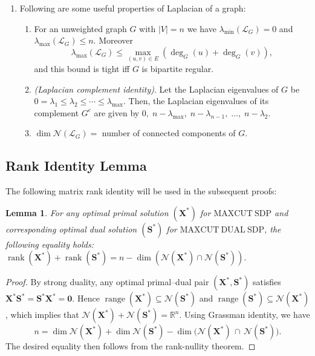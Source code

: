 \documentclass[a4paper,fleqn]{cas-sc}
\newcommand{\R}{\mathbb{R}}
\newcommand{\X}{\mathbf{X}}
\renewcommand{\L}{\mathcal{L}}
\newcommand{\1}{\mathbf{1}}
\newcommand{\bz}{\mathbf{0}}
\newcommand{\bS}{\mathbf{S}}
\newtheorem{lemma}[theorem]{Lemma}
\DeclareMathOperator{\rank}{rank}
\DeclareMathOperator{\range}{range}
\begin{document}
\begin{enumerate}
\item Following are some useful properties of Laplacian of a graph:

\begin{enumerate}
        \item For an unweighted graph \(G\) with \(|V|=n\) we have \(\lambda_{\min}(\L_G)=0\) and \(\lambda_{\max}(\L_G)\le n\). Moreover
\[
\lambda_{\max}(\L_G)\le\max_{(u,v)\in E}(\deg_G(u)+\deg_G(v)),
\]
and this bound is tight iff \(G\) is bipartite regular.
    \item \textit{(Laplacian complement identity)}. Let the Laplacian eigenvalues of $G$ be $0 = \lambda_1 \le \lambda_2 \le \cdots \le \lambda_{\max}$. Then, the Laplacian eigenvalues of its complement $G^c$ are given by $0, \; n - \lambda_{\max}, \; n - \lambda_{n-1}, \; \dots, \; n - \lambda_2$.
    \item $\dim \mathcal{N}(\L_G)=$ number of connected components of $G$.
\end{enumerate}
\end{enumerate}

\subsection{Rank Identity Lemma}

The following matrix rank identity will be used in the subsequent proofs:

\begin{lemma}\label{sylvester}
   For any optimal primal solution $(\X^*)$ for $\mathrm{MAXCUT\ SDP}$ and corresponding optimal dual solution $(\bS^*)$ for $\mathrm{MAXCUT\ DUAL\ SDP}$, the following equality holds:
   $\rank(\X^*) + \rank(\bS^*) = n - \dim \left( \mathcal{N}(\X^*) \cap \mathcal{N}(\bS^*)\right).$
\end{lemma}

\begin{proof}
    By strong duality, any optimal primal--dual pair $(\X^*,\bS^*)$ satisfies 
$\X^*\bS^*=\bS^*\X^*=\bz$. Hence $\range(\X^*)\subseteq \mathcal{N}(\bS^*)$ and 
$\range(\bS^*)\subseteq \mathcal{N}(\X^*)$, which implies that 
$\mathcal{N}(\X^*)+\mathcal{N}(\bS^*)=\R^n$. Using Grassman identity, we have
\[
n = \dim \mathcal{N}(\X^*) + \dim \mathcal{N}(\bS^*) 
    - \dim \bigl(\mathcal{N}(\X^*) \, \cap \, \mathcal{N}(\bS^*)\bigr).
\]
The desired equality then follows from the rank-nullity theorem.
\end{proof}
\end{document}
